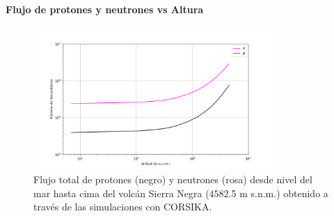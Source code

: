     \begin{frame}{} %
        \justifying %
        \vspace*{-0.3cm} %

        \begin{tcolorbox}[colback=custombgcolor8, coltext=customfgcolor2,
                      colframe=custombgcolor8, %
                      width=\textwidth,       %
                      boxrule=1pt,            %
                      top=0.1mm, bottom=0.1mm,     %
                      sharp corners=all,     %
                      halign=center,         %
                      valign=center,         %
                      ]
            \textbf{Flujo de protones y neutrones vs Altura}        
        \end{tcolorbox}
        \vspace*{-0.4cm} %
        
        \begin{figure}
            \centering
            \includegraphics[width=0.81\textwidth]{Figures/Thesis_flux_protons_and_neutrons.png}
            \caption{\tiny Flujo total de protones (negro) y neutrones (rosa) desde nivel del mar hasta cima del volcán Sierra Negra ($4582$.5 m s.n.m.) obtenido a través de las simulaciones con CORSIKA.}
        \end{figure}
    \end{frame} 
    
